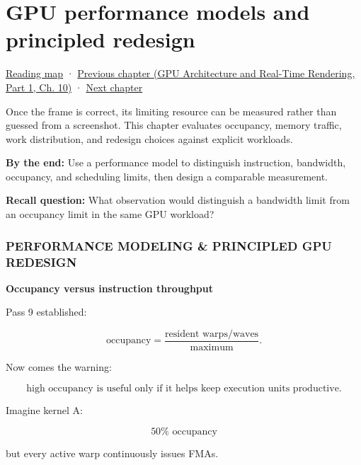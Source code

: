 \chapter{GPU performance models and principled redesign}\label{05-engine-i-ch020-gpu-performance-models-and-principled-redesign}\hypertarget{05-engine-i-ch020}{}\label{stagechapter:05-engine-i-ch020}

\hypertarget{05-engine-i-ch020-gpu-performance-models-and-principled-redesign}{}

\hyperref[volume-reading-map]{Reading map} · \href{../06-GPU-Architecture-and-Real-Time-Rendering-P01/main.pdf\#05-engine-i-ch019-gpu-work-and-reusable-metal-frames}{Previous chapter (GPU Architecture and Real-Time Rendering, Part 1, Ch. 10)} · \hyperref[05-engine-i-ch021-buffers-images-memory-and-uploads]{Next chapter}

Once the frame is correct, its limiting resource can be measured rather than guessed from a screenshot. This chapter evaluates occupancy, memory traffic, work distribution, and redesign choices against explicit workloads.

\textbf{By the end:} Use a performance model to distinguish instruction, bandwidth, occupancy, and scheduling limits, then design a comparable measurement.

\textbf{Recall question:} What observation would distinguish a bandwidth limit from an occupancy limit in the same GPU workload?

\subsection{PERFORMANCE MODELING \& PRINCIPLED GPU REDESIGN}\label{05-engine-i-ch020-performance-modeling-principled-gpu-redesign}

\hypertarget{05-engine-i-ch020-performance-modeling-principled-gpu-redesign}{}

\textbf{Occupancy versus instruction throughput}

Pass 9 established:

\[
\text{occupancy}
=
\frac{
\text{resident warps/waves}
}{
\text{maximum}
}.
\]

Now comes the warning:

\[
\boxed{
\text{high occupancy is useful only if it helps keep execution units productive}.
}
\]

Imagine kernel A:

\[
50\%\text{ occupancy}
\]

but every active warp continuously issues FMAs.


